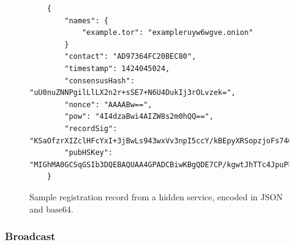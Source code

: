 \begin{figure}
	\begin{lstlisting}
	{
		"names": {
			"example.tor": "exampleruyw6wgve.onion"
		}
		"contact": "AD97364FC20BEC80",
		"timestamp": 1424045024,
		"consensusHash": "uU0nuZNNPgilLlLX2n2r+sSE7+N6U4DukIj3rOLvzek=",
		"nonce": "AAAABw==",
		"pow": "4I4dzaBwi4AIZW8s2m0hQQ==",
		"recordSig": 	"KSaOfzrXIZclHFcYxI+3jBwLs943wxVv3npI5ccY/kBEpyXRSopzjoFs746n0tJqUpdY4Kbe6DBwERaN7ELmSSK9Pu6q8QeKzNAh+QOnKl0fKBN7fqowjkQ3ktFkR0Vuox9WrrbNTMa4+up0Np52hlbKA3zSRz4fbR9NVlh6uuQ=",
		"pubHSKey": "MIGhMA0GCSqGSIb3DQEBAQUAA4GPADCBiwKBgQDE7CP/kgwtJhTTc4JpuPkvA7Ln9wgc+fgTKgkyUp1zusxgUAn1c1MGx4YhO42KPB7dyZOf3pcRk94XsYFY1ULkF2+tf9KdNe7GFzJyMFCQENnUcVXbcwLH4vAeiGK7R/nScbCbyc9LT+VE1fbKchTL1QzLVBLqJTxhR+9YPi8x+QIFAdZ8BJs="
	}
	\end{lstlisting}
	\caption{Sample registration record from a hidden service, encoded in JSON and base64.}
	\label{fig:sampleRecord}
\end{figure}



\subsubsection{Broadcast}

